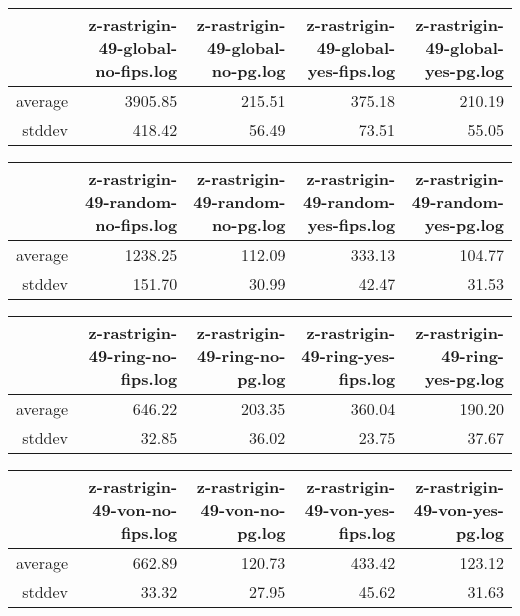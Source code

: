 \begin{table}[ht]
\centering
\begin{tabular}{rrrrr}
  \hline
 & z-rastrigin-49-global-no-fips.log & z-rastrigin-49-global-no-pg.log & z-rastrigin-49-global-yes-fips.log & z-rastrigin-49-global-yes-pg.log \\ 
  \hline
average & 3905.85 & 215.51 & 375.18 & 210.19 \\ 
  stddev & 418.42 & 56.49 & 73.51 & 55.05 \\ 
   \hline
\end{tabular}
\end{table}
\begin{table}[ht]
\centering
\begin{tabular}{rrrrr}
  \hline
 & z-rastrigin-49-random-no-fips.log & z-rastrigin-49-random-no-pg.log & z-rastrigin-49-random-yes-fips.log & z-rastrigin-49-random-yes-pg.log \\ 
  \hline
average & 1238.25 & 112.09 & 333.13 & 104.77 \\ 
  stddev & 151.70 & 30.99 & 42.47 & 31.53 \\ 
   \hline
\end{tabular}
\end{table}
\begin{table}[ht]
\centering
\begin{tabular}{rrrrr}
  \hline
 & z-rastrigin-49-ring-no-fips.log & z-rastrigin-49-ring-no-pg.log & z-rastrigin-49-ring-yes-fips.log & z-rastrigin-49-ring-yes-pg.log \\ 
  \hline
average & 646.22 & 203.35 & 360.04 & 190.20 \\ 
  stddev & 32.85 & 36.02 & 23.75 & 37.67 \\ 
   \hline
\end{tabular}
\end{table}
\begin{table}[ht]
\centering
\begin{tabular}{rrrrr}
  \hline
 & z-rastrigin-49-von-no-fips.log & z-rastrigin-49-von-no-pg.log & z-rastrigin-49-von-yes-fips.log & z-rastrigin-49-von-yes-pg.log \\ 
  \hline
average & 662.89 & 120.73 & 433.42 & 123.12 \\ 
  stddev & 33.32 & 27.95 & 45.62 & 31.63 \\ 
   \hline
\end{tabular}
\end{table}
